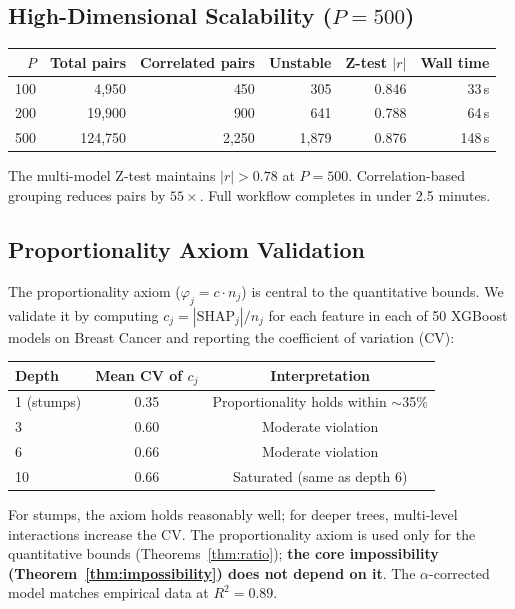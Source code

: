 \documentclass{article}
\begin{document}
\subsection{High-Dimensional Scalability ($P = 500$)}

\begin{center}
\small
\begin{tabular}{@{}rrrrrr@{}}
\toprule
$P$ & Total pairs & Correlated pairs & Unstable & Z-test $|r|$ & Wall time \\
\midrule
100 & 4,950 & 450 & 305 & 0.846 & 33\,s \\
200 & 19,900 & 900 & 641 & 0.788 & 64\,s \\
500 & 124,750 & 2,250 & 1,879 & 0.876 & 148\,s \\
\bottomrule
\end{tabular}
\end{center}

The multi-model Z-test maintains $|r| > 0.78$ at $P = 500$. Correlation-based grouping reduces pairs by $55\times$. Full workflow completes in under 2.5 minutes.

\subsection{Proportionality Axiom Validation}

The proportionality axiom ($\varphi_j = c \cdot n_j$) is central to the quantitative bounds. We validate it by computing $c_j = |\text{SHAP}_j| / n_j$ for each feature in each of 50 XGBoost models on Breast Cancer and reporting the coefficient of variation (CV):

\begin{center}
\small
\begin{tabular}{@{}lcc@{}}
\toprule
Depth & Mean CV of $c_j$ & Interpretation \\
\midrule
1 (stumps) & 0.35 & Proportionality holds within $\sim$35\% \\
3 & 0.60 & Moderate violation \\
6 & 0.66 & Moderate violation \\
10 & 0.66 & Saturated (same as depth 6) \\
\bottomrule
\end{tabular}
\end{center}

For stumps, the axiom holds reasonably well; for deeper trees, multi-level interactions increase the CV. The proportionality axiom is used only for the quantitative bounds (Theorems~\ref{thm:ratio}); \textbf{the core impossibility (Theorem~\ref{thm:impossibility}) does not depend on it}. The $\alpha$-corrected model matches empirical data at $R^2 = 0.89$.
\end{document}
